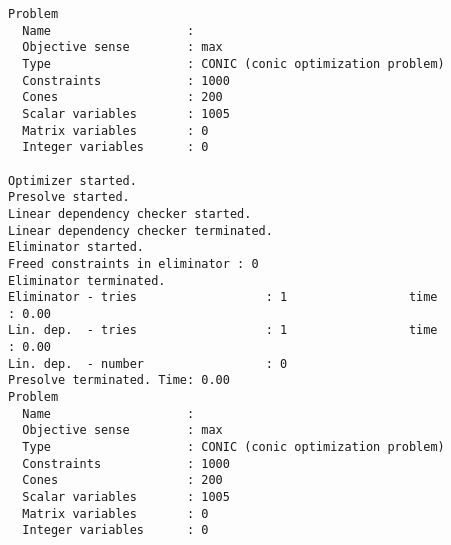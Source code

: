 \documentclass[
  10pt,
  a4paper,
,tablecaptionabove
]{scrartcl}
\begin{document}
\begin{verbatim}
Problem
  Name                   :                 
  Objective sense        : max             
  Type                   : CONIC (conic optimization problem)
  Constraints            : 1000            
  Cones                  : 200             
  Scalar variables       : 1005            
  Matrix variables       : 0               
  Integer variables      : 0               

Optimizer started.
Presolve started.
Linear dependency checker started.
Linear dependency checker terminated.
Eliminator started.
Freed constraints in eliminator : 0
Eliminator terminated.
Eliminator - tries                  : 1                 time                   : 0.00            
Lin. dep.  - tries                  : 1                 time                   : 0.00            
Lin. dep.  - number                 : 0               
Presolve terminated. Time: 0.00    
Problem
  Name                   :                 
  Objective sense        : max             
  Type                   : CONIC (conic optimization problem)
  Constraints            : 1000            
  Cones                  : 200             
  Scalar variables       : 1005            
  Matrix variables       : 0               
  Integer variables      : 0               


\end{verbatim}
\end{document}
